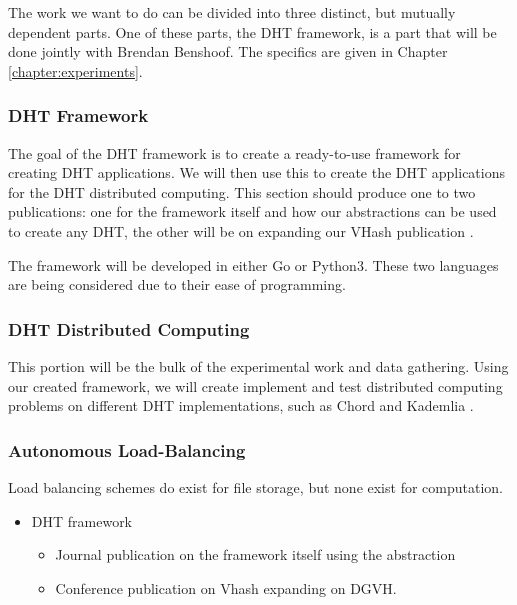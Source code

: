 The work we want to do can be divided into three distinct, but mutually dependent parts.
One of these parts, the DHT framework, is a part that will be done jointly with Brendan Benshoof.
The specifics are given in Chapter \ref{chapter:experiments}.


\subsubsection{DHT Framework}
The goal of the DHT framework is to create a ready-to-use framework for creating DHT applications.
We will then use this to create the DHT applications for the DHT distributed computing.
This section should produce one to two publications:  one for the framework itself and how our abstractions can be used to create any DHT, the other will be on expanding our VHash publication \cite{vhash}.

The framework will be developed in either Go or Python3.
These two languages are being considered due to their ease of programming.




\subsubsection{DHT Distributed Computing}

This portion will be the bulk of the experimental work and data gathering.
Using our created framework, we will create implement and test distributed computing problems on different DHT implementations, such as Chord \cite{chord} and Kademlia \cite{kademlia}.

\subsubsection{Autonomous Load-Balancing}
Load balancing schemes do exist for file storage, but none exist for computation.

\begin{itemize}
	\item DHT framework
	\begin{itemize}
		\item Journal publication on the framework itself using the abstraction
		\item Conference publication on Vhash expanding on DGVH.
	\end{itemize}
\end{itemize}

